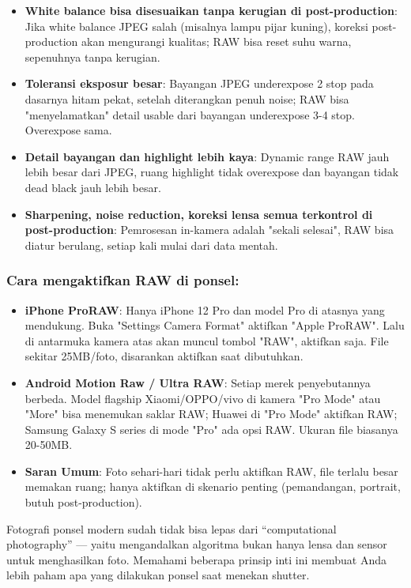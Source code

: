 \begin{itemize}
  \item \textbf{White balance bisa disesuaikan tanpa kerugian di post-production}: Jika white balance JPEG salah (misalnya lampu pijar kuning), koreksi post-production akan mengurangi kualitas; RAW bisa reset suhu warna, sepenuhnya tanpa kerugian.
  \item \textbf{Toleransi eksposur besar}: Bayangan JPEG underexpose 2 stop pada dasarnya hitam pekat, setelah diterangkan penuh noise; RAW bisa "menyelamatkan" detail usable dari bayangan underexpose 3-4 stop. Overexpose sama.
  \item \textbf{Detail bayangan dan highlight lebih kaya}: Dynamic range RAW jauh lebih besar dari JPEG, ruang highlight tidak overexpose dan bayangan tidak dead black jauh lebih besar.
  \item \textbf{Sharpening, noise reduction, koreksi lensa semua terkontrol di post-production}: Pemrosesan in-kamera adalah "sekali selesai", RAW bisa diatur berulang, setiap kali mulai dari data mentah.
\end{itemize}

\subsubsection*{Cara mengaktifkan RAW di ponsel:}

\begin{itemize}
  \item \textbf{iPhone ProRAW}: Hanya iPhone 12 Pro dan model Pro di atasnya yang mendukung. Buka "Settings Camera Format" aktifkan "Apple ProRAW". Lalu di antarmuka kamera atas akan muncul tombol "RAW", aktifkan saja. File sekitar 25MB/foto, disarankan aktifkan saat dibutuhkan.
  \item \textbf{Android Motion Raw / Ultra RAW}: Setiap merek penyebutannya berbeda. Model flagship Xiaomi/OPPO/vivo di kamera "Pro Mode" atau "More" bisa menemukan saklar RAW; Huawei di "Pro Mode" aktifkan RAW; Samsung Galaxy S series di mode "Pro" ada opsi RAW. Ukuran file biasanya 20-50MB.
  \item \textbf{Saran Umum}: Foto sehari-hari tidak perlu aktifkan RAW, file terlalu besar memakan ruang; hanya aktifkan di skenario penting (pemandangan, portrait, butuh post-production).
\end{itemize}


Fotografi ponsel modern sudah tidak bisa lepas dari “computational photography” — yaitu mengandalkan algoritma bukan hanya lensa dan sensor untuk menghasilkan foto. Memahami beberapa prinsip inti ini membuat Anda lebih paham apa yang dilakukan ponsel saat menekan shutter.


